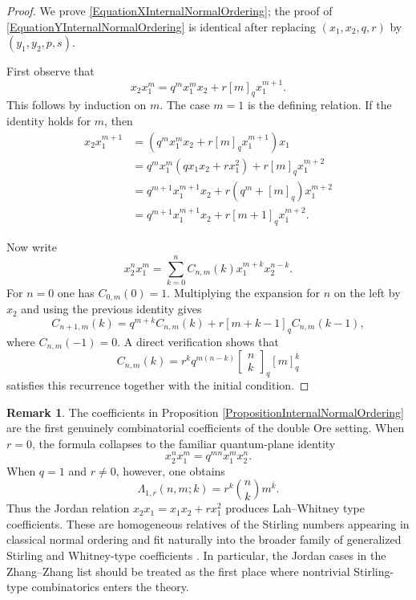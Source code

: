 \documentclass{amsart}
\theoremstyle{definition}
\newtheorem{remark}[theorem]{Remark}
\theoremstyle{remark}
\numberwithin{equation}{section}
\begin{document}
\begin{proof}
We prove \eqref{EquationXInternalNormalOrdering}; the proof of \eqref{EquationYInternalNormalOrdering} is identical after replacing $(x_1,x_2,q,r)$ by $(y_1,y_2,p,s)$.

First observe that
\[
x_2x_1^m
=
q^mx_1^mx_2+r[m]_qx_1^{m+1}.
\]
This follows by induction on $m$. The case $m=1$ is the defining relation. If the identity holds for $m$, then
\begin{align*}
x_2x_1^{m+1}
&=
\left(q^mx_1^mx_2+r[m]_qx_1^{m+1}\right)x_1\\
&=
q^mx_1^m(qx_1x_2+rx_1^2)+r[m]_qx_1^{m+2}\\
&=
q^{m+1}x_1^{m+1}x_2+r(q^m+[m]_q)x_1^{m+2}\\
&=
q^{m+1}x_1^{m+1}x_2+r[m+1]_qx_1^{m+2}.
\end{align*}

Now write
\[
x_2^nx_1^m
=
\sum_{k=0}^{n}
C_{n,m}(k)x_1^{m+k}x_2^{n-k}.
\]
For $n=0$ one has $C_{0,m}(0)=1$. Multiplying the expansion for $n$ on the left by $x_2$ and using the previous identity gives
\[
C_{n+1,m}(k)
=
q^{m+k}C_{n,m}(k)
+
r[m+k-1]_qC_{n,m}(k-1),
\]
where $C_{n,m}(-1)=0$. A direct verification shows that
\[
C_{n,m}(k)
=
r^kq^{m(n-k)}
\begin{bmatrix}
n\\
k
\end{bmatrix}_q
[m]_{q}^{\overline{k}}
\]
satisfies this recurrence together with the initial condition.
\end{proof}

\begin{remark}\label{RemarkStirlingLahWhitney}
The coefficients in Proposition \ref{PropositionInternalNormalOrdering} are the first genuinely combinatorial coefficients of the double Ore setting. When $r=0$, the formula collapses to the familiar quantum-plane identity
\[
x_2^nx_1^m=q^{mn}x_1^mx_2^n.
\]
When $q=1$ and $r\neq 0$, however, one obtains
\[
\Lambda_{1,r}(n,m;k)
=
r^k\binom{n}{k}m^{\overline{k}}.
\]
Thus the Jordan relation $x_2x_1=x_1x_2+rx_1^2$ produces Lah--Whitney type coefficients. These are homogeneous relatives of the Stirling numbers appearing in classical normal ordering and fit naturally into the broader family of generalized Stirling and Whitney-type coefficients \cite{HsuShiue1998}. In particular, the Jordan cases in the Zhang--Zhang list should be treated as the first place where nontrivial Stirling-type combinatorics enters the theory.
\end{remark}
\end{document}

